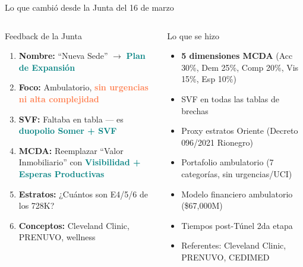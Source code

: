 \documentclass[aspectratio=169, 11pt]{beamer}
\newcommand{\highlight}[1]{\textcolor{teal}{\textbf{#1}}}
\newcommand{\danger}[1]{\textcolor{coral}{\textbf{#1}}}
\begin{document}
\begin{frame}{Lo que cambió desde la Junta del 16 de marzo}

\begin{columns}[T]
\begin{alertblock}{\small Feedback de la Junta}
\footnotesize
\begin{enumerate}\setlength{\itemsep}{2pt}
  \item \textbf{Nombre:} ``Nueva Sede'' $\to$ \highlight{Plan de Expansión}
  \item \textbf{Foco:} Ambulatorio, \danger{sin urgencias ni alta complejidad}
  \item \textbf{SVF:} Faltaba en tabla --- es \highlight{duopolio Somer + SVF}
  \item \textbf{MCDA:} Reemplazar ``Valor Inmobiliario'' con \highlight{Visibilidad + Esperas Productivas}
  \item \textbf{Estratos:} ¿Cuántos son E4/5/6 de los 728K?
  \item \textbf{Conceptos:} Cleveland Clinic, PRENUVO, wellness
\end{enumerate}
\end{alertblock}

\begin{exampleblock}{\small Lo que se hizo}
\footnotesize
\begin{itemize}\setlength{\itemsep}{2pt}
  \item[$\checkmark$] \textbf{5 dimensiones MCDA} (Acc 30\%, Dem 25\%, Comp 20\%, Vis 15\%, Esp 10\%)
  \item[$\checkmark$] SVF en todas las tablas de brechas
  \item[$\checkmark$] Proxy estratos Oriente (Decreto 096/2021 Rionegro)
  \item[$\checkmark$] Portafolio ambulatorio (7 categorías, sin urgencias/UCI)
  \item[$\checkmark$] Modelo financiero ambulatorio (\$67,000M)
  \item[$\checkmark$] Tiempos post-Túnel 2da etapa
  \item[$\checkmark$] Referentes: Cleveland Clinic, PRENUVO, CEDIMED
\end{itemize}
\end{exampleblock}
\end{columns}
\end{frame}
\end{document}
